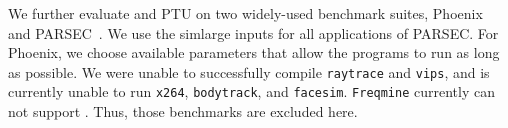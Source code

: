 \begin{table}
\centering
{}
\caption{False sharing detection results using PTU and \sheriffdetect{}. \sheriffdetect{} correctly reports only actual false sharing instances that have performance impact;
\cmark{} indicates a correct report and \xmark{} indicates a false alarm. 
\label{table:microbenchmarks}}
\end{table}

We further evaluate \SheriffDetect{} and PTU on two widely-used benchmark suites, Phoenix~\cite{phoenix-hpca} and PARSEC~\cite{parsec}. We use the simlarge inputs for all applications of PARSEC. For Phoenix, we choose available parameters that allow the programs to run as long as possible. We were unable to successfully compile \texttt{raytrace} and \texttt{vips}, and \sheriff{} is currently unable to run \texttt{x264}, \texttt{bodytrack}, and \texttt{facesim}. \texttt{Freqmine} currently can not support \pthreads{}. Thus, those benchmarks are excluded here. 
 
